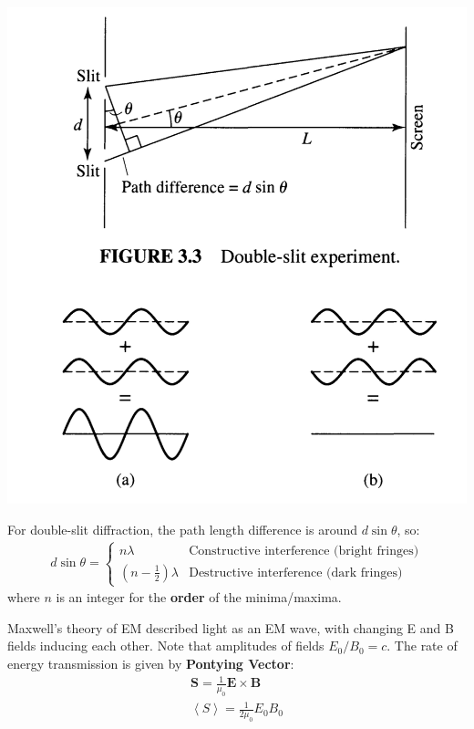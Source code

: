 \documentclass[12pt]{article}
\begin{document}
\begin{center}
\includegraphics[scale=0.3]{Figures/DoubleSlitDiagram}
\end{center}

For double-slit diffraction, the path length difference is around $d\sin\theta$, so:
\begin{align*}
    d\sin\theta = \begin{cases} 
        n\lambda & \text{Constructive interference (bright fringes)} \\
        \left(n-\frac{1}{2}\right)\lambda & \text{Destructive interference (dark fringes)}
     \end{cases}
\end{align*}
where $n$ is an integer for the \textbf{order} of the minima/maxima.

Maxwell's theory of EM described light as an EM wave, with changing E and B fields inducing each other. Note that amplitudes of fields $E_0/B_0 = c$. The rate of energy transmission is given by \textbf{Pontying Vector}:
\begin{align*}
    \textbf{S} = \frac{1}{\mu_0}\textbf{E}\times\textbf{B} \\
    \left<S\right> = \frac{1}{2\mu_0}E_0B_0
\end{align*}
\end{document}

